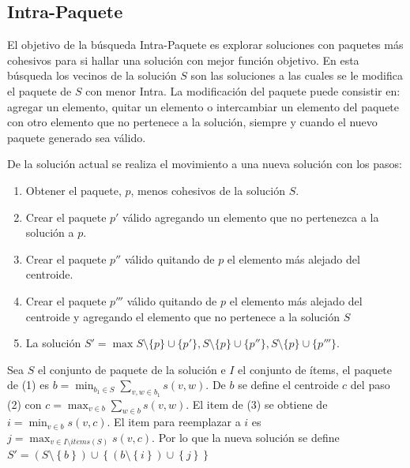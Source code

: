 \subsection{Intra-Paquete}
El objetivo de la búsqueda Intra-Paquete es explorar soluciones con paquetes más cohesivos para si hallar una solución con mejor función objetivo. En esta búsqueda los vecinos de la solución $S$ son las soluciones a las cuales se le modifica el paquete de $S$ con menor Intra. La modificación del paquete puede consistir en: agregar un elemento, quitar un elemento o intercambiar un elemento del paquete con otro elemento que no pertenece a la solución, siempre y cuando el nuevo paquete generado sea válido.

De la solución actual se realiza el movimiento a una nueva solución con los pasos:
\begin{enumerate}
	\item Obtener el paquete, $p$, menos cohesivos de la solución $S$.
	\item Crear el paquete $p'$ válido agregando un elemento que no pertenezca a la solución a $p$.
	\item Crear el paquete $p''$ válido quitando de $p$ el elemento más alejado del centroide.
	\item Crear el paquete $p'''$ válido quitando de $p$ el elemento más alejado del centroide y agregando el elemento que no pertenece a la solución $S$
	\item La solución $S' = \max{S\setminus\{p\}\cup\{p'\}, S\setminus\{p\}\cup\{p''\}, S\setminus\{p\}\cup\{p'''\}}$.
\end{enumerate}

Sea $S$ el conjunto de paquete de la solución e $I$ el conjunto de ítems, el paquete de (1) es $b = \min_{b_1 \in S}{\sum_{v,w \in b_1}{s(v,w)}}$. De $b$ se define el centroide $c$ del paso (2) con $c = \max_{v \in b}{\sum_{w \in b}{s(v,w)}}$. El item de (3) se obtiene de $i = \min_{v \in b}{s(v,c)}$. El item para reemplazar a $i$ es $j = \max_{v \in I \setminus items(S)}{s(v,c)}$. Por lo que la nueva solución se define $S' = (S \setminus \left\{b\right\}) \cup \left\{(b \setminus \left\{i\right\})\cup\left\{j\right\}\right\}$


